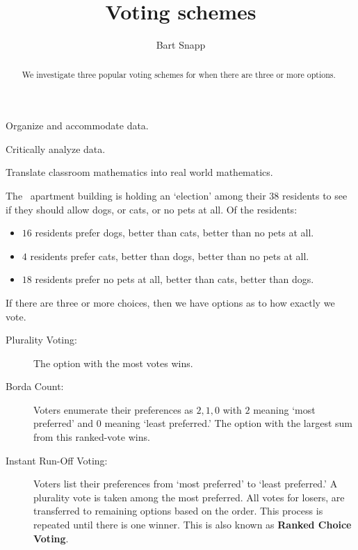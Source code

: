 \documentclass[nooutcomes,noauthor,hints,handout,12pt]{ximera}
\title{Voting schemes}
\author{Bart Snapp}
\begin{document}
\begin{abstract}
  We investigate three popular voting schemes for when there are three
  or more options.
\end{abstract}
\maketitle

\begin{listOutcomes}
\item Organize and accommodate data.
\item Critically analyze data.
\item Translate classroom mathematics into real world mathematics.
\end{listOutcomes}


The \mooculus~apartment building is holding an `election' among
their $38$ residents to see if they should allow dogs, or cats, or no
pets at all. Of the residents:
\begin{itemize}
\item $16$ residents prefer dogs, better than cats, better than no pets at all.
\item $4$ residents prefer cats, better than dogs, better than no pets at all.
\item $18$ residents prefer no pets at all, better than cats, better
  than dogs.
\end{itemize}



If there are three or more choices, then we have options as to how
exactly we vote. 
\begin{description}
\item[Plurality Voting:] The option with the most
  votes wins.
\item[Borda Count:] Voters enumerate their preferences as $2,1,0$
  with $2$ meaning `most preferred' and $0$ meaning `least preferred.'
  The option with the largest sum from this ranked-vote wins.
\item[Instant Run-Off Voting:] Voters list their preferences from `most
  preferred' to `least preferred.' A plurality vote is taken among the
  most preferred. All votes for losers, are transferred to remaining
  options based on the order. This process is repeated until there is
  one winner. This is also known as \textbf{Ranked Choice Voting}.
\end{description}
\end{document}
